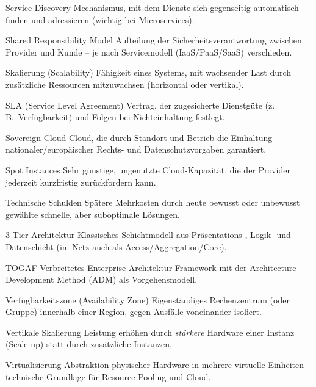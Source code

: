 \begin{glossar}
  \item[Service Discovery] Mechanismus, mit dem Dienste sich gegenseitig
        automatisch finden und adressieren (wichtig bei Microservices).

  \item[Shared Responsibility Model] Aufteilung der Sicherheitsverantwortung
        zwischen Provider und Kunde -- je nach Servicemodell (IaaS/PaaS/SaaS) verschieden.

  \item[Skalierung (Scalability)] Fähigkeit eines Systems, mit wachsender Last
        durch zusätzliche Ressourcen mitzuwachsen (horizontal oder vertikal).

  \item[SLA (Service Level Agreement)] Vertrag, der zugesicherte Dienstgüte
        (z.\,B.\ Verfügbarkeit) und Folgen bei Nichteinhaltung festlegt.

  \item[Sovereign Cloud] Cloud, die durch Standort und Betrieb die Einhaltung
        nationaler/europäischer Rechts- und Datenschutzvorgaben garantiert.

  \item[Spot Instances] Sehr günstige, ungenutzte Cloud-Kapazität, die der
        Provider jederzeit kurzfristig zurückfordern kann.

  \item[Technische Schulden] Spätere Mehrkosten durch heute bewusst oder
        unbewusst gewählte schnelle, aber suboptimale Lösungen.

  \item[3-Tier-Architektur] Klassisches Schichtmodell aus Präsentations-,
        Logik- und Datenschicht (im Netz auch als Access/Aggregation/Core).

  \item[TOGAF] Verbreitetes Enterprise-Architektur-Framework mit der
        Architecture Development Method (ADM) als Vorgehensmodell.

  \item[Verfügbarkeitszone (Availability Zone)] Eigenständiges Rechenzentrum
        (oder Gruppe) innerhalb einer Region, gegen Ausfälle voneinander isoliert.

  \item[Vertikale Skalierung] Leistung erhöhen durch \emph{stärkere} Hardware
        einer Instanz (Scale-up) statt durch zusätzliche Instanzen.

  \item[Virtualisierung] Abstraktion physischer Hardware in mehrere virtuelle
        Einheiten -- technische Grundlage für Resource Pooling und Cloud.


\end{glossar}
